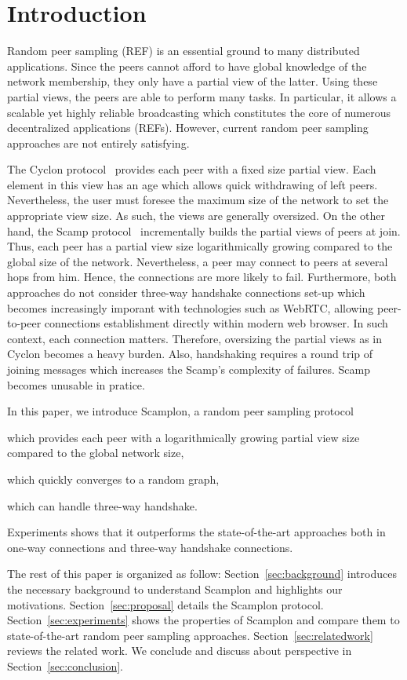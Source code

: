 
\section{Introduction}
Random peer sampling (REF) is an essential ground to many distributed
applications. Since the peers cannot afford to have global knowledge of the
network membership, they only have a partial view of the latter. Using these
partial views, the peers are able to perform many tasks. In particular, it
allows a scalable yet highly reliable broadcasting which constitutes the core
of numerous decentralized applications (REFs). However, current random peer
sampling approaches are not entirely satisfying. 

The Cyclon protocol~\cite{voulgaris2005cyclon} provides each peer with a fixed
size partial view.  Each element in this view has an age which allows quick
withdrawing of left peers. Nevertheless, the user must foresee the maximum size
of the network to set the appropriate view size. As such, the views are
generally oversized. On the other hand, the Scamp
protocol~\cite{ganesh2003peer} incrementally builds the partial views of peers
at join. Thus, each peer has a partial view size logarithmically growing
compared to the global size of the network. Nevertheless, a peer may connect to
peers at several hops from him. Hence, the connections are more likely to fail.
Furthermore, both approaches do not consider three-way handshake connections
set-up which becomes increasingly imporant with technologies such as WebRTC,
allowing peer-to-peer connections establishment directly within modern web
browser. In such context, each connection matters. Therefore, oversizing the
partial views as in Cyclon becomes a heavy burden. Also, handshaking requires a
round trip of joining messages which increases the Scamp's complexity of
failures. Scamp becomes unusable in pratice.

In this paper, we introduce Scamplon, a random peer sampling protocol
\begin{inparaenum}[(i)]
\item which provides each peer with a logarithmically growing partial view size
  compared to the global network size,
\item which quickly converges to a random graph,
\item which can handle three-way handshake.
\end{inparaenum}
Experiments shows that it outperforms the state-of-the-art approaches both in
one-way connections and three-way handshake connections.

The rest of this paper is organized as follow: Section~\ref{sec:background}
introduces the necessary background to understand Scamplon and highlights our
motivations. Section~\ref{sec:proposal} details the Scamplon protocol.
Section~\ref{sec:experiments} shows the properties of Scamplon and compare them
to state-of-the-art random peer sampling
approaches. Section~\ref{sec:relatedwork} reviews the related work. We conclude
and discuss about perspective in Section~\ref{sec:conclusion}.

